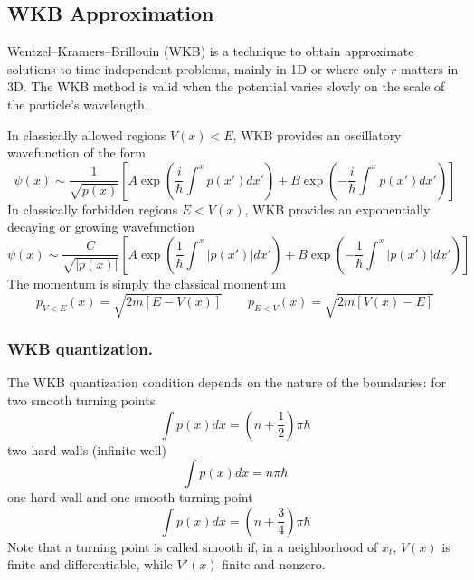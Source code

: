 \documentclass[../../../main.tex]{subfiles}
\begin{document}
\subsection{WKB Approximation}
Wentzel--Kramers--Brillouin (WKB) is a technique to obtain approximate solutions to time independent problems, mainly in 1D or where only $r$ matters in 3D.
The WKB method is valid when the potential varies slowly on the scale of the particle’s wavelength.

In classically allowed regions $V(x)<E$, WKB provides an oscillatory wavefunction of the form
\begin{equation*}
    \psi(x) \sim \frac{1}{\sqrt{p(x)}} \left[A\exp\left(\frac{i}{\hbar} \int^{x} p(x') dx'\right) + B\exp\left(-\frac{i}{\hbar} \int^{x} p(x') dx'\right)\right]
\end{equation*}
In classically forbidden regions $E<V(x)$, WKB provides an exponentially decaying or growing wavefunction
\begin{equation*}
    \psi(x) \sim \frac{C}{\sqrt{|p(x)|}} \left[A\exp\left( \frac{1}{\hbar} \int^{x} |p(x')| dx' \right) + B\exp\left( -\frac{1}{\hbar} \int^{x} |p(x')| dx' \right)\right]
\end{equation*}
The momentum is simply the classical momentum
\begin{equation*}
    p_{V<E}(x) = \sqrt{2m[E - V(x)]}\qquad
    p_{E<V}(x) = \sqrt{2m[ V(x)-E]}
\end{equation*}

\subsubsection{WKB quantization.}
The WKB quantization condition depends on the nature of the boundaries: for two smooth turning points
\begin{equation*}
    \int p(x) dx = (n + \frac{1}{2}) \pi \hbar
\end{equation*}
two hard walls (infinite well)
\begin{equation*}
    \int p(x) dx = n \pi \hbar
\end{equation*}
one hard wall and one smooth turning point
\begin{equation*}
    \int p(x) dx = (n + \frac{3}{4}) \pi \hbar
\end{equation*}
Note that a turning point is called smooth if, in a neighborhood of $x_t$, $V(x)$ is finite and differentiable, while $V'(x)$ finite and nonzero.
\end{document}
